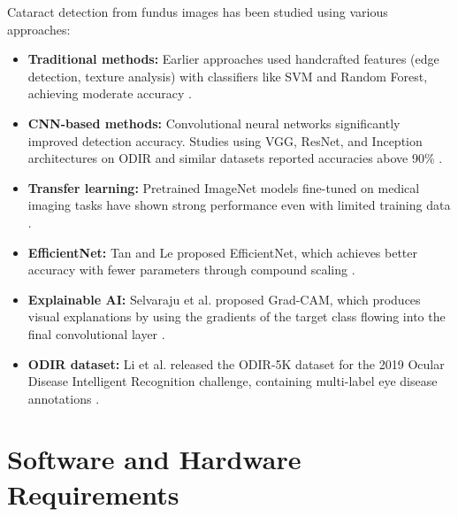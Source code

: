 \documentclass[12pt, a4paper]{article}
\begin{document}
Cataract detection from fundus images has been studied using various approaches:

\begin{itemize}
    \item \textbf{Traditional methods:} Earlier approaches used handcrafted features (edge detection, texture analysis) with classifiers like SVM and Random Forest, achieving moderate accuracy \cite{yang2016}.
    \item \textbf{CNN-based methods:} Convolutional neural networks significantly improved detection accuracy. Studies using VGG, ResNet, and Inception architectures on ODIR and similar datasets reported accuracies above 90\% \cite{ali2022}.
    \item \textbf{Transfer learning:} Pretrained ImageNet models fine-tuned on medical imaging tasks have shown strong performance even with limited training data \cite{raghu2019}.
    \item \textbf{EfficientNet:} Tan and Le proposed EfficientNet, which achieves better accuracy with fewer parameters through compound scaling \cite{tan2019}.
    \item \textbf{Explainable AI:} Selvaraju et al. proposed Grad-CAM, which produces visual explanations by using the gradients of the target class flowing into the final convolutional layer \cite{selvaraju2017}.
    \item \textbf{ODIR dataset:} Li et al. released the ODIR-5K dataset for the 2019 Ocular Disease Intelligent Recognition challenge, containing multi-label eye disease annotations \cite{li2021}.
\end{itemize}

\section{Software and Hardware Requirements}
\end{document}
